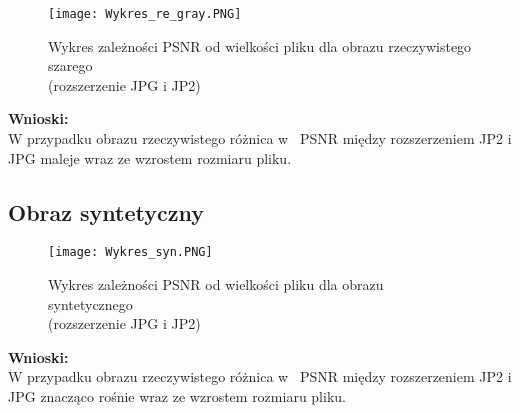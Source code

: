 \documentclass[a4paper, 12pt]{article}
\begin{document}
\begin{figure}[H]

\centering
  
{\texttt{[image: Wykres\_re\_gray.PNG]}}
  
\captionsetup{justification=centering}
  
\caption{Wykres zależności PSNR od wielkości pliku dla obrazu rzeczywistego szarego \\ (rozszerzenie JPG i JP2)}
  
\label{fig:fig6}
\end{figure}

\textbf{Wnioski:} \\ 
W przypadku obrazu rzeczywistego różnica w~ PSNR między rozszerzeniem JP2 i JPG maleje wraz ze wzrostem rozmiaru pliku.

\subsection{Obraz syntetyczny}

\begin{figure}[H]

\centering
  
{\texttt{[image: Wykres\_syn.PNG]}}
  
\captionsetup{justification=centering}
  
\caption{Wykres zależności PSNR od wielkości pliku dla obrazu syntetycznego \\ (rozszerzenie JPG i JP2)}
  
\label{fig:fig7}
\end{figure}

\textbf{Wnioski:} \\ 
W przypadku obrazu rzeczywistego różnica w~ PSNR między rozszerzeniem JP2 i JPG znacząco rośnie wraz ze wzrostem rozmiaru pliku.
\end{document}
